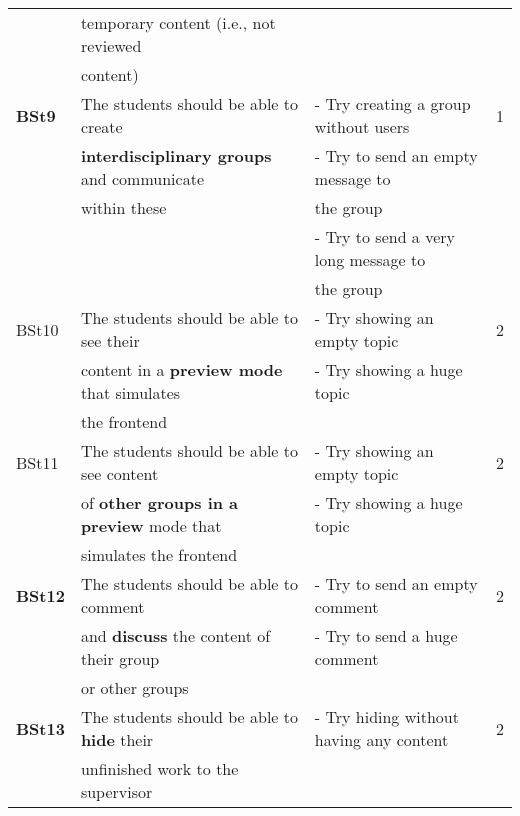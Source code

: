 \documentclass[twoside,openright,fleqn,pointlessnumbers,headinclude,,11pt,a4paper,BCOR5mm,footinclude,cleardoubleempty,abstracton %
                ]{scrreprt}
\begin{document}
\begin{table}[h]
\begin{tabular}{llll}
		& temporary content (i.e., not reviewed 				&	& \\
		&	content)									&	& \\
	\hline
	\textbf{BSt9} & The students should be able to create 			& - Try creating a group without users  	& 1\\
		& \textbf{interdisciplinary groups} and communicate	& - Try to send an empty message to	& \\
		& within these									& the group	& \\
		& 											& - Try to send a very long message to	& \\
		& 											& the group	& \\
	\hline
	BSt10& The students should be able to see their 			& - Try showing an empty topic 	& 2\\
		& content in a \textbf{preview mode} that simulates	& - Try showing a huge topic	&	\\
		& the frontend									&	& \\
	\hline
	BSt11& The students should be able to see content 		& -  Try showing an empty topic & 2\\
		& of \textbf{other groups in a preview} mode that 		& - Try showing a huge topic	&	\\
		& simulates the frontend							&	& \\
	\hline
	\textbf{BSt12}& The students should be able to comment  			& - Try to send an empty comment  & 2\\
		& and \textbf{discuss} the content of their group		& - Try to send a huge comment	 & \\
		& or other groups								&	 & \\
	\hline
	\textbf{BSt13}& The students should be able to \textbf{hide} their 	& - Try hiding without having any content & 2\\
		& unfinished work to the supervisor					&	& \\
			\hline
	\end{tabular}
	\label{RequirementsBackendStudent}
	\end{table}
\end{document}
